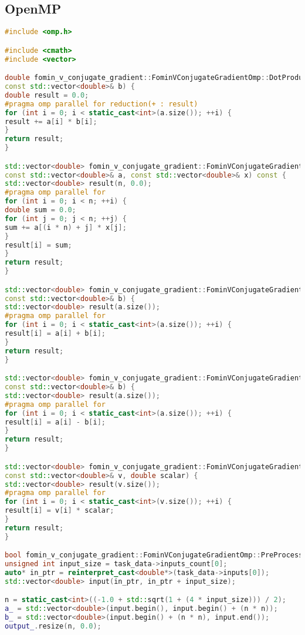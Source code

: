 \documentclass[12pt]{article}
\begin{document}
\subsection*{OpenMP}
\begin{lstlisting}[language=C++]
#include <omp.h>

#include <cmath>
#include <vector>

double fomin_v_conjugate_gradient::FominVConjugateGradientOmp::DotProduct(const std::vector<double>& a,
const std::vector<double>& b) {
double result = 0.0;
#pragma omp parallel for reduction(+ : result)
for (int i = 0; i < static_cast<int>(a.size()); ++i) {
result += a[i] * b[i];
}
return result;
}

std::vector<double> fomin_v_conjugate_gradient::FominVConjugateGradientOmp::MatrixVectorMultiply(
const std::vector<double>& a, const std::vector<double>& x) const {
std::vector<double> result(n, 0.0);
#pragma omp parallel for 
for (int i = 0; i < n; ++i) {
double sum = 0.0;
for (int j = 0; j < n; ++j) {
sum += a[(i * n) + j] * x[j];
}
result[i] = sum;
}
return result;
}

std::vector<double> fomin_v_conjugate_gradient::FominVConjugateGradientOmp::VectorAdd(const std::vector<double>& a,
const std::vector<double>& b) {
std::vector<double> result(a.size());
#pragma omp parallel for 
for (int i = 0; i < static_cast<int>(a.size()); ++i) {
result[i] = a[i] + b[i];
}
return result;
}

std::vector<double> fomin_v_conjugate_gradient::FominVConjugateGradientOmp::VectorSub(const std::vector<double>& a,
const std::vector<double>& b) {
std::vector<double> result(a.size());
#pragma omp parallel for 
for (int i = 0; i < static_cast<int>(a.size()); ++i) {
result[i] = a[i] - b[i];
}
return result;
}

std::vector<double> fomin_v_conjugate_gradient::FominVConjugateGradientOmp::VectorScalarMultiply(
const std::vector<double>& v, double scalar) {
std::vector<double> result(v.size());
#pragma omp parallel for 
for (int i = 0; i < static_cast<int>(v.size()); ++i) {
result[i] = v[i] * scalar;
}
return result;
}

bool fomin_v_conjugate_gradient::FominVConjugateGradientOmp::PreProcessingImpl() {
unsigned int input_size = task_data->inputs_count[0];
auto* in_ptr = reinterpret_cast<double*>(task_data->inputs[0]);
std::vector<double> input(in_ptr, in_ptr + input_size);

n = static_cast<int>((-1.0 + std::sqrt(1 + (4 * input_size))) / 2);
a_ = std::vector<double>(input.begin(), input.begin() + (n * n));
b_ = std::vector<double>(input.begin() + (n * n), input.end());
output_.resize(n, 0.0);


\end{lstlisting}
\end{document}
